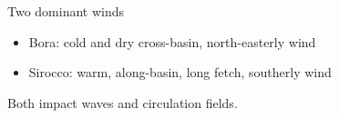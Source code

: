 \documentclass{beamer}
\begin{document}
{\begin{center}
\begin{minipage}[b]{5.3cm}
{}\par
\end{minipage}
\begin{minipage}[b]{5.3cm}
Two dominant winds
\begin{itemize}
\item Bora: cold and dry cross-basin, north-easterly wind
\item Sirocco: warm, along-basin, long fetch, southerly wind
\end{itemize}
Both impact waves and circulation fields.
\end{minipage}
\end{center}

}
\end{document}
